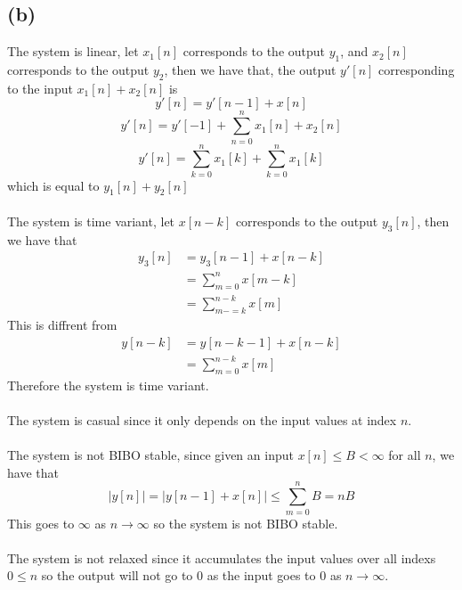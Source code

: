 \subsection*{(b)}
The system is linear, let 
$x_1[n]$ corresponds to the output $y_1$, and $x_2[n]$ corresponds to the output $y_2$, then we have that, 
the output $y'[n]$ corresponding to the input $x_1[n]+x_2[n]$ is
$$y'[n]=y'[n-1]+x[n]$$
$$y'[n]=y'[-1]+\sum_{n=0}^{n}x_1[n]+x_2[n]$$
$$y'[n]=\sum_{k=0}^{n}x_1[k]+\sum_{k=0}^{n}x_1[k]$$
which is equal to $y_1[n]+y_2[n]$\\\\
The system is time variant, let $x[n-k]$ corresponds to the output $y_3[n]$, then we have that
\begin{align*}
    y_3[n]&=y_3[n-1]+x[n-k]\\
    &=\sum_{m=0}^{n}x[m-k]\\
    &=\sum_{m-=k}^{n-k}x[m]
\end{align*}
This is diffrent from 
\begin{align*}
    y[n-k]&=y[n-k-1]+x[n-k]\\
    &=\sum_{m=0}^{n-k}x[m]
\end{align*}
Therefore the system is time variant.\\\\
The system is casual since it only depends on the input values at index $n$.\\\\
The system is not BIBO stable, since given an input $x[n]\leq B<\infty$ for all $n$, we have that
$$|y[n]|=|y[n-1]+x[n]|\leq \sum_{m=0}^{n}B =nB$$
This goes to $\infty$ as $n\to\infty$ so the system is not BIBO stable.\\\\
The system is not relaxed since it accumulates the input values over all indexs $0\leq n$ so
the output will not go to $0$ as the input goes to $0$ as $n\to\infty$.

